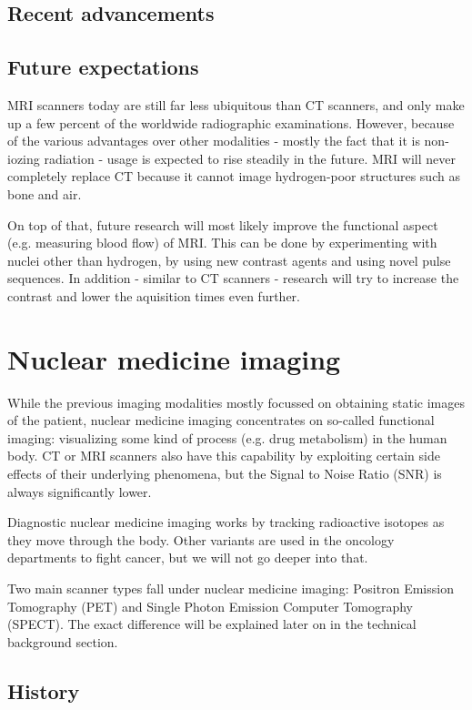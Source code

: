 
\subsection{Recent advancements}

\subsection{Future expectations}
MRI scanners today are still far less ubiquitous than CT scanners, and only make
up a few percent of the worldwide radiographic examinations. However, because of
the various advantages over other modalities - mostly the fact that it is
non-iozing radiation - usage is expected to rise steadily in the future. MRI
will never completely replace CT because it cannot image hydrogen-poor
structures such as bone and air.

On top of that, future research will most likely improve the functional aspect
(e.g. measuring blood flow) of MRI. This can be done by experimenting with
nuclei other than hydrogen, by using new contrast agents and using novel pulse
sequences. In addition - similar to CT scanners - research will try to increase
the contrast and lower the aquisition times even further.

\section{Nuclear medicine imaging}
While the previous imaging modalities mostly focussed on obtaining static images
of the patient, nuclear medicine imaging concentrates on so-called functional
imaging: visualizing some kind of process (e.g. drug metabolism) in the human
body. CT or MRI scanners also have this capability by exploiting certain side
effects of their underlying phenomena, but the Signal to Noise Ratio (SNR) is
always significantly lower.

Diagnostic nuclear medicine imaging works by tracking radioactive isotopes as
they move through the body. Other variants are used in the oncology departments
to fight cancer, but we will not go deeper into that. 

Two main scanner types fall under nuclear medicine imaging: Positron Emission
Tomography (PET) and Single Photon Emission Computer Tomography (SPECT). The
exact difference will be explained later on in the technical background section.

\subsection{History}

